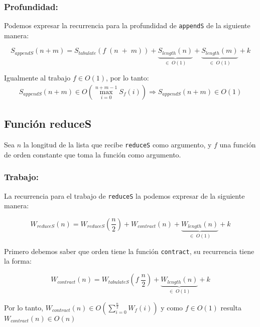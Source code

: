 \documentclass[11pt]{article}
\begin{document}
\subsubsection{Profundidad:}
Podemos expresar la recurrencia para la profundidad de \texttt{appendS} de 
la siguiente manera:

\begin{equation*}
    S_{appendS}(n + m) = S_{tabulate}(f \; (n \; +\; m)) + \underbrace{S_{length}(n)}_{\in \; O(1)}
    + \underbrace{S_{length}(m)}_{\in \; O(1)} + k
\end{equation*}

Igualmente al trabajo $f \in O(1)$, por lo tanto:
\begin{align*}
    S_{appendS}(n + m) \in O\left(\displaystyle\max_{i=0}^{n + m - 1}S_f(i)\right)
    \Rightarrow S_{appendS}(n + m) \in O(1)
\end{align*}


\subsection{Función reduceS}

Sea $n$ la longitud de la lista que recibe \texttt{reduceS} como argumento, y $f$
una función de orden constante que toma la función como argumento.

\subsubsection{Trabajo:}

La recurrencia para el trabajo de \texttt{reduceS} la podemos expresar de
la siguiente manera:

\begin{equation*}
    W_{reduceS}(n) =  W_{reduceS}(\frac{n}{2}) + W_{contract}(n) + \underbrace{W_{length}(n)}_{\in \; O(1)} + k
\end{equation*}

Primero debemos saber que orden tiene la función \texttt{contract}, su recurrencia
tiene la forma:

\begin{equation*}
    W_{contract}(n) = W_{tabulateS}(f \; \frac{n}{2}) + \underbrace{W_{length}(n)}_{\in \; O(1)} + k
\end{equation*}

Por lo tanto, $W_{contract}(n) \in O\left(\displaystyle\sum_{i=0}^{\frac{n}{2}}W_f(i)\right) $
y como $f\in O(1)$ resulta $W_{contract}(n) \in O(n)$
\end{document}

